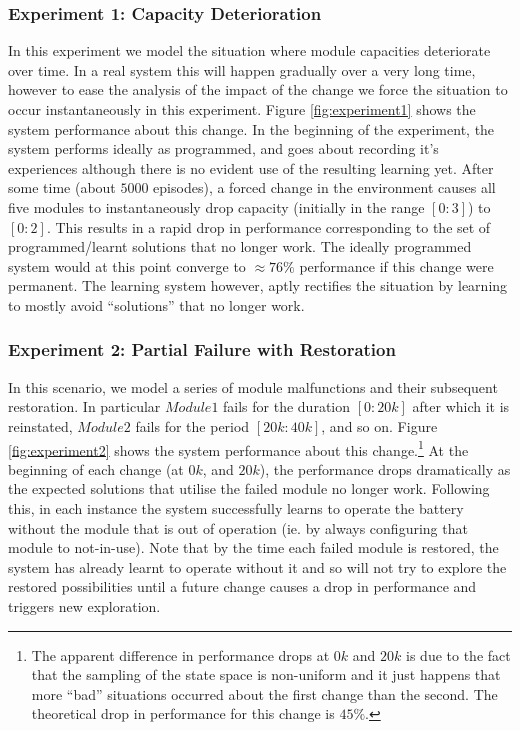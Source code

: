 

 

\subsubsection{Experiment 1: Capacity Deterioration}

In this experiment we model the situation where module capacities deteriorate over time. In a real system this will happen gradually over a very long time, however to ease the analysis of the impact of the change we force the situation to occur instantaneously in this experiment. Figure \ref{fig:experiment1} shows the system performance about this change. In the beginning of the experiment, the system performs ideally as programmed, and goes about recording it's experiences although there is no evident use of the resulting learning yet. After some time (about $5000$ episodes), a forced change in the environment causes all five modules to instantaneously drop capacity (initially in the range $[0:3]$) to $[0:2]$. This results in a rapid drop in performance corresponding to the set of programmed/learnt solutions that no longer work. The ideally programmed system would at this point converge to $\approx 76\%$ performance if this change were permanent. The learning system however, aptly rectifies the situation by learning to mostly avoid ``solutions'' that no longer work. 


%

\subsubsection{Experiment 2: Partial Failure with Restoration}

In this scenario, we model a series of module malfunctions and their subsequent restoration. In particular $Module1$ fails for the duration $[0:20k]$ after which it is reinstated, $Module2$ fails for the period $[20k:40k]$, and so on. Figure \ref{fig:experiment2} shows the system performance about this change.\footnote{The apparent difference in performance drops at $0k$ and $20k$ is due to the fact that the sampling of the state space is non-uniform and it just happens that more ``bad'' situations occurred about the first change than the second. The theoretical drop in performance for this change is $45\%$.} At the beginning of each change (at $0k$, and $20k$), the performance drops dramatically as the expected solutions that utilise the failed module no longer work. Following this, in each instance the system successfully learns to operate the battery without the module that is out of operation (ie. by always configuring that module to not-in-use). Note that by the time each failed module is restored, the system has already learnt to operate without it and so will not try to explore the restored possibilities until a future change causes a drop in performance and triggers new exploration.


